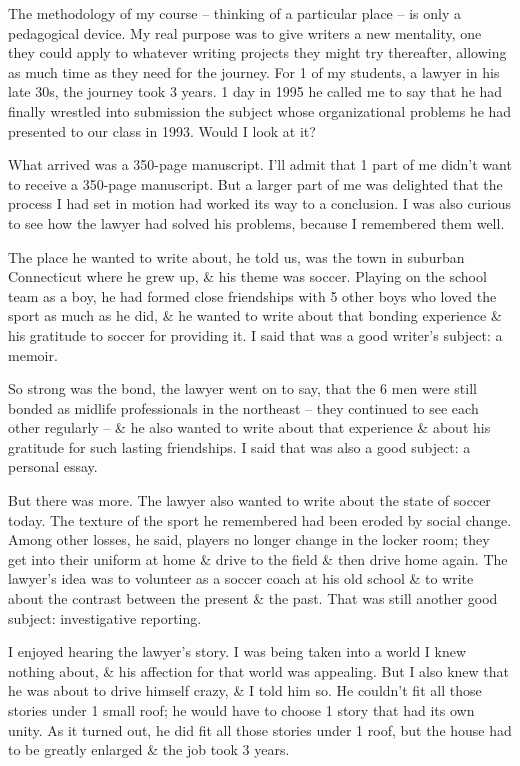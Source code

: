 \documentclass{article}
\numberwithin{equation}{section}
\begin{document}
The methodology of my course -- thinking of a particular place -- is only a pedagogical device. My real purpose was to give writers a new mentality, one they could apply to whatever writing projects they might try thereafter, allowing as much time as they need for the journey. For 1 of my students, a lawyer in his late 30s, the journey took 3 years. 1 day in 1995 he called me to say that he had finally wrestled into submission the subject whose organizational problems he had presented to our class in 1993. Would I look at it?

What arrived was a 350-page manuscript. I'll admit that 1 part of me didn't want to receive a 350-page manuscript. But a larger part of me was delighted that the process I had set in motion had worked its way to a conclusion. I was also curious to see how the lawyer had solved his problems, because I remembered them well.

The place he wanted to write about, he told us, was the town in suburban Connecticut where he grew up, \& his theme was soccer. Playing on the school team as a boy, he had formed close friendships with 5 other boys who loved the sport as much as he did, \& he wanted to write about that bonding experience \& his gratitude to soccer for providing it. I said that was a good writer's subject: a memoir.

So strong was the bond, the lawyer went on to say, that the 6 men were still bonded as midlife professionals in the northeast -- they continued to see each other regularly -- \& he also wanted to write about that experience \& about his gratitude for such lasting friendships. I said that was also a good subject: a personal essay.

But there was more. The lawyer also wanted to write about the state of soccer today. The texture of the sport he remembered had been eroded by social change. Among other losses, he said, players no longer change in the locker room; they get into their uniform at home \& drive to the field \& then drive home again. The lawyer's idea was to volunteer as a soccer coach at his old school \& to write about the contrast between the present \& the past. That was still another good subject: investigative reporting.

I enjoyed hearing the lawyer's story. I was being taken into a world I knew nothing about, \& his affection for that world was appealing. But I also knew that he was about to drive himself crazy, \& I told him so. He couldn't fit all those stories under 1 small roof; he would have to choose 1 story that had its own unity. As it turned out, he did fit all those stories under 1 roof, but the house had to be greatly enlarged \& the job took 3 years.
\end{document}
